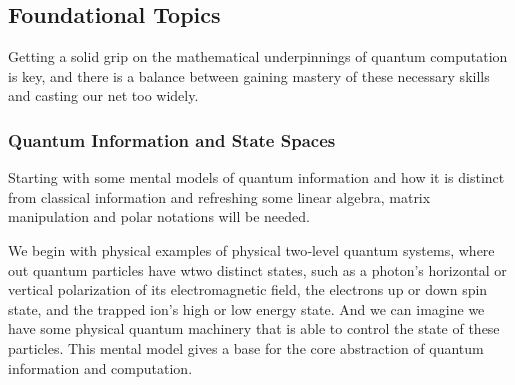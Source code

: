 \subsection{Foundational Topics}

Getting a solid grip on the mathematical underpinnings of quantum computation is key, 
and there is a balance between gaining mastery of these necessary skills and casting our net too widely.



\subsubsection{Quantum Information and State Spaces}

Starting with some mental models of quantum information and how it is distinct from classical information
and refreshing some linear algebra, matrix manipulation and polar notations will be needed.  

We begin with physical examples of physical two‑level quantum systems, 
where out quantum particles have wtwo distinct states, such as a photon's horizontal or vertical polarization of its electromagnetic field, 
the electrons up or down spin state, and the trapped ion's high or low energy state.
And we can imagine we have some physical quantum machinery that is able to control the state of these particles.
This mental model gives a base for the core abstraction of quantum information and computation.

